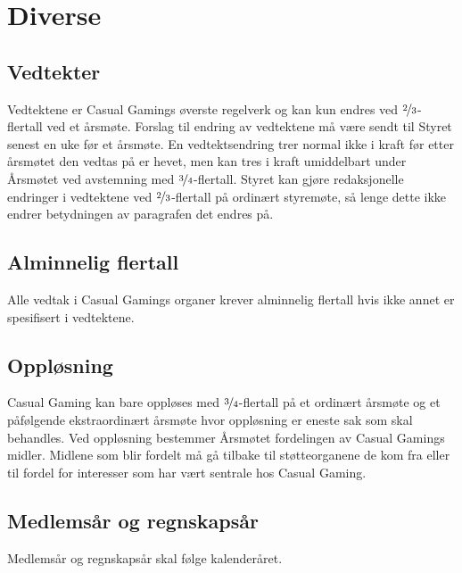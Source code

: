 \chapter{Diverse}

\section{Vedtekter}
Vedtektene er Casual Gamings øverste regelverk og kan kun endres ved $\nicefrac{2}{3}$-flertall ved et årsmøte. Forslag til endring av vedtektene må være sendt til Styret senest en uke før et årsmøte. En vedtektsendring trer normal ikke i kraft før etter årsmøtet den vedtas på er hevet, men kan tres i kraft umiddelbart under Årsmøtet ved avstemning med $\nicefrac{3}{4}$-flertall. Styret kan gjøre redaksjonelle endringer i vedtektene ved $\nicefrac{2}{3}$-flertall på ordinært styremøte, så lenge dette ikke endrer betydningen av paragrafen det endres på.

\section{Alminnelig flertall}
Alle vedtak i Casual Gamings organer krever alminnelig flertall hvis ikke annet er spesifisert i vedtektene.

\section{Oppløsning}
Casual Gaming kan bare oppløses med $\nicefrac{3}{4}$-flertall på et ordinært årsmøte og et påfølgende ekstraordinært årsmøte hvor oppløsning er eneste sak som skal behandles. Ved oppløsning bestemmer Årsmøtet fordelingen av Casual Gamings midler. Midlene som blir fordelt må gå tilbake til støtteorganene de kom fra eller til fordel for interesser som har vært sentrale hos Casual Gaming.

\section{Medlemsår og regnskapsår}
Medlemsår og regnskapsår skal følge kalenderåret.
